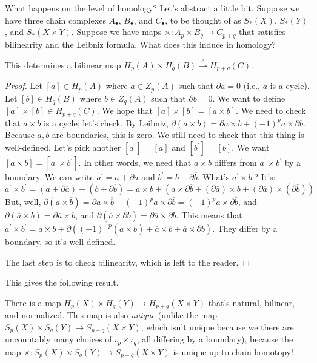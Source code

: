 What happens on the level of homology? Let's abstract a little bit. Suppose we have three chain complexes $A_\bullet$, $B_\bullet$, and $C_\bullet$, to be thought of as $S_\ast(X)$, $S_\ast(Y)$, and $S_\ast(X\times Y)$. Suppose we have maps $\times: A_p\times B_q\to C_{p+q}$ that satisfies bilinearity and the Leibniz formula. What does this induce in homology?
\begin{lemma}
This determines a bilinear map $ H_p(A)\times H_q(B)\xrightarrow{\times} H_{p+q}(C)$.
\end{lemma}
\begin{proof}
Let $[a]\in H_p(A)$ where $a\in Z_p(A)$ such that $\partial a=0$ (i.e., $a$ is a cycle). Let $[b]\in H_q(B)$ where $b\in Z_q(A)$ such that $\partial b=0$. We want to define $[a]\times [b]\in H_{p+q}(C)$. We hope that $[a]\times [b]=[a\times b]$. We need to check that $a\times b$ is a cycle; let's check. By Leibniz, $\partial(a\times b)=\partial a\times b+(-1)^pa\times\partial b$. Because $a,b$ are boundaries, this is zero. We still need to check that this thing is well-defined. Let's pick another $[a^\prime]=[a]$ and $[b^\prime]=[b]$. We want $[a\times b]=[a^\prime\times b^\prime]$. In other words, we need that $a\times b$ differs from $a^\prime\times b^\prime$ by a boundary. We can write $a^\prime=a+\partial\overline{a}$ and $b^\prime=b+\partial\overline{b}$. What's $a^\prime\times b^\prime$? It's:
	\begin{equation*}
	a^\prime\times b^\prime=(a+\partial\overline{a})+(b+\partial\overline{b})
	= a\times b+\left(a\times\partial\overline{b} + (\partial\overline{a})\times b+(\partial\overline{a})\times(\partial\overline{b})\right)
	\end{equation*}
But, well, $\partial(a\times\overline{b})=\partial a\times\overline{b}+(-1)^pa\times\partial\overline{b}=(-1)^pa\times\partial\overline{b}$, and $\partial(\overline{a}\times b)=\partial\overline{a}\times b$, and $\partial(\overline{a}\times\partial\overline{b})=\partial\overline{a}\times\partial\overline{b}$. This means that $a^\prime\times b^\prime=a\times b+\partial((-1)^{-p}(a\times \overline{b}) + \overline{a}\times b + \overline{a}\times\partial\overline{b})$. They differ by a boundary, so it's well-defined.

The last step is to check bilinearity, which is left to the reader.
\end{proof}
This gives the following result.
\begin{theorem}
There is a map $ H_p(X)\times H_q(Y)\to H_{p+q}(X\times Y)$ that's natural, bilinear, and normalized. This map is also \emph{unique} (unlike the map $S_p(X)\times S_q(Y)\to S_{p+q}(X\times Y)$, which isn't unique because we there are uncountably many choices of $\iota_p\times\iota_q$, all differing by a boundary), because the map $\times:S_p(X)\times S_q(Y)\to S_{p+q}(X\times Y)$ is unique up to chain homotopy!
\end{theorem}
